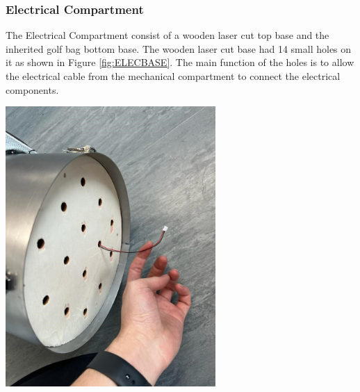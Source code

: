 \documentclass[11pt,landscape]{article}
\newenvironment{Figure}
  {\par\medskip\noindent\minipage{\linewidth}}
  {\endminipage\par\medskip}
\begin{document}
\begin{multicols}{3}
    \subsubsection{Electrical Compartment}
    The Electrical Compartment consist of a wooden laser cut top base and the
    inherited golf bag bottom base. The wooden laser cut base had 14 small holes
    on it as shown in Figure \ref{fig:ELECBASE}. The main function of the holes
    is to allow the electrical cable from the mechanical compartment to connect
    the electrical components.
    
    \begin{Figure}
        \begin{center}
            \includegraphics[width=0.6\textwidth]{Figure8.jpg}
            \label{fig:ELECBASE}
        \end{center}
    \end{Figure}
    
    
    

\end{multicols}
\end{document}
